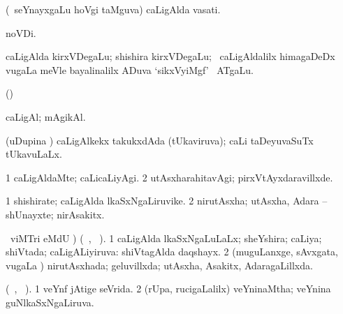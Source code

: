 {{{{{{\bentry
{}
 \gl{\nA}\bmng
(\kanmu\ seYnayxgaLu hoVgi taMguva) caLigAlda vasati. 
\emng
\eentry

\bentry
{}
 \gl{\nA}\bmng
{} 
\emng
\eentry

\bentry
{}
 \gl{\nA}\bmng
{} noVDi. 
\emng
\eentry

\bentry
{}
 \gl{\nA}\bmng
caLigAlda kirxVDegaLu; shishira kirxVDegaLu; \kanmu\ caLigAldalilx himagaDeDx \mo vugaLa meVle bayalinalilx ADuva `sikxVyiMgf' \mo\ ATgaLu. 
\emng
\eentry

\bentry
{}
  \gl{\nA}\bmng
(\kAparx)  
\emng
\eentry

\bentry
{}
  \gl{\nA}\bmng
caLigAl; mAgikAl. 
\emng
\eentry

\bentry
{}
  \gl{\gu}\bmng
(uDupina \vi) caLigAlkekx takukxdAda (tUkaviruva); caLi taDeyuvaSuTx tUkavuLaLx. 
\emng
\eentry

\bentry
{}
  \gl{\gu}\bmng
{} 
\emng
\eentry

\bentry
{}
  \gl{\kirxvi}\bmng
\bnum
\num{1} caLigAldaMte; caLicaLiyAgi. 
\num{2} utAsxharahitavAgi; pirxVtAyxdaravillxde. 
\enum
\emng
\eentry

\bentry
{}
  \gl{\nA}\bmng
\bnum
\num{1} shishirate; caLigAlda lkaSxNgaLiruvike. 
\num{2} nirutAsxha; utAsxha, Adara -- shUnayxte; nirAsakitx. 
\enum
\emng
\eentry

\bentry
{}
  \gl{\gu}  \ucAcx\ viMTri eMdU \parx) (\tara\ , \tama\ ).  \bmng
\bnum
\num{1} caLigAlda lkaSxNgaLuLaLx; sheYshira; caLiya; shiVtada; caLigALiyiruva:  shiVtagAlda daqshayx. 
\num{2} (muguLanxge, sAvxgata, \mo vugaLa \vi) nirutAsxhada; geluvillxda; utAsxha, Asakitx, AdaragaLillxda. 
\enum
\emng
\eentry

\bentry
{}
  \gl{\gu} (\tara\ , \tama\ ).\bmng
\bnum
\num{1} veYnf jAtige seVrida. 
\num{2} (rUpa, rucigaLalilx) veYninaMtha; veYnina guNlkaSxNgaLiruva. 
\enum
\emng
\eentry

}}}}}}
